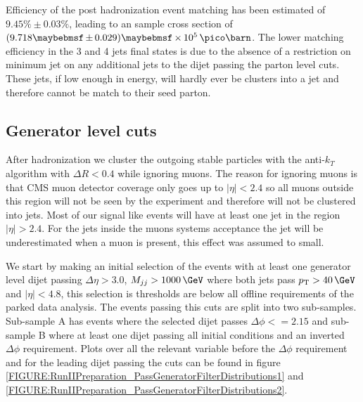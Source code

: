 

Efficiency of the post hadronization event matching has been estimated of $9.45\% \pm 0.03\%$, leading to an sample cross section of $(9.718 \pm 0.029) \times 10^5\,\pico\barn$. The lower matching efficiency in the 3 and 4 jets final states is due to the absence of a restriction on minimum jet \pt on any additional jets to the dijet passing the parton level cuts. These jets, if low enough in energy, will hardly ever be clusters into a jet and therefore cannot be match to their seed parton.

\subsection{Generator level cuts}
\label{SUBSECTION:RunIIPreparation_GeneratorLevelCuts}


After hadronization we cluster the outgoing stable particles with the anti-$k_T$ algorithm with $\Delta R<0.4$ while ignoring muons. The reason for ignoring muons is that \gls{CMS} muon detector coverage only goes up to $|\eta|<2.4$ so all muons outside this region will not be seen by the experiment and therefore will not be clustered into jets. Most of our signal like events will have at least one jet in the region $|\eta|>2.4$. For the jets inside the muons systems acceptance the jet \pt will be underestimated when a muon is present, this effect was assumed to small.

We start by making an initial selection of the events with at least one generator level dijet passing $\Delta\eta > 3.0$, $M_{jj} > 1000\,\GeV$ where both jets pass $\pt > 40\,\GeV$ and $|\eta|<4.8$, this selection is thresholds are below all offline requirements of the parked data analysis. The events passing this cuts are split into two sub-samples. Sub-sample A has events where the selected dijet passes $\Delta\phi<=2.15$ and sub-sample B where at least one dijet passing all initial conditions and an inverted $\Delta\phi$ requirement. Plots over all the relevant variable before the $\Delta\phi$ requirement and for the leading dijet passing the cuts can be found in figure \ref{FIGURE:RunIIPreparation_PassGeneratorFilterDistributions1} and \ref{FIGURE:RunIIPreparation_PassGeneratorFilterDistributions2}.

